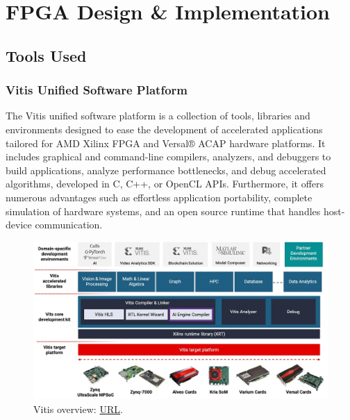 \chapter{FPGA Design \& Implementation} 
\label{Chapter-FPGA-Implementation}

\section{Tools Used}
\subsection{Vitis Unified Software Platform}
The Vitis unified software platform\cite{Vitis_unified_software_platform} is a collection of tools, libraries and environments designed to ease the development of accelerated applications tailored for AMD Xilinx FPGA and Versal® ACAP hardware platforms. It includes graphical and command-line compilers, analyzers, and debuggers to build applications, analyze performance bottlenecks, and debug accelerated algorithms, developed in C, C++, or OpenCL APIs. Furthermore, it offers numerous advantages such as effortless application portability, complete simulation of hardware systems, and an open source runtime that handles host-device communication.
\begin{figure}[H]
    \centering
        \includegraphics[width=1\textwidth]{Images/Platform/vitis.jpg}
        \decoRule
        \caption[Vitis]{Vitis overview: \href{https://www.xilinx.com/products/design-tools/vitis/vitis-platform.html\#overview}{URL}.}
        \label{fig:Vitis_overview}
\end{figure}


